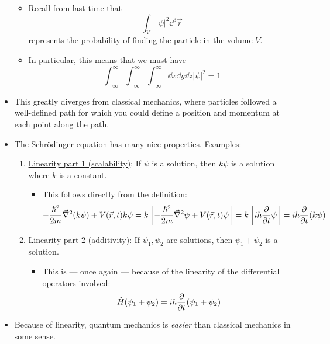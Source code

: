 \documentclass[../notes.tex]{subfiles}
\begin{document}
\begin{itemize}
\begin{itemize}
        \item Recall from last time that
        \begin{equation*}
            \int_V|\psi|^2\dd^3\vec{r}
        \end{equation*}
        represents the probability of finding the particle in the volume $V$.
        \item In particular, this means that we must have
        \begin{equation*}
            \int_{-\infty}^\infty\int_{-\infty}^\infty\int_{-\infty}^\infty\dd{x}\dd{y}\dd{z}|\psi|^2 = 1
        \end{equation*}
    \end{itemize}
    \item This greatly diverges from classical mechanics, where particles followed a well-defined path for which you could define a position and momentum at each point along the path.
    \item The Schr\"{o}dinger equation has many nice properties. Examples:
    \begin{enumerate}
        \item \underline{Linearity part 1 (scalability)}: If $\psi$ is a solution, then $k\psi$ is a solution where $k$ is a constant.
        \begin{itemize}
            \item This follows directly from the definition:
            \begin{equation*}
                -\frac{\hbar^2}{2m}\vec{\nabla}^2(k\psi)+V(\vec{r},t)k\psi = k\left[ -\frac{\hbar^2}{2m}\vec{\nabla}^2\psi+V(\vec{r},t)\psi \right] = k\left[ i\hbar\pdv{t}\psi \right] = i\hbar\pdv{t}(k\psi)
            \end{equation*}
        \end{itemize}
        \item \underline{Linearity part 2 (additivity)}: If $\psi_1,\psi_2$ are solutions, then $\psi_1+\psi_2$ is a solution.
        \begin{itemize}
            \item This is --- once again --- because of the linearity of the differential operators involved:
            \begin{equation*}
                \hat{H}(\psi_1+\psi_2) = i\hbar\pdv{t}(\psi_1+\psi_2)
            \end{equation*}
        \end{itemize}
    \end{enumerate}
    \item Because of linearity, quantum mechanics is \emph{easier} than classical mechanics in some sense.

\end{itemize}
\end{document}
